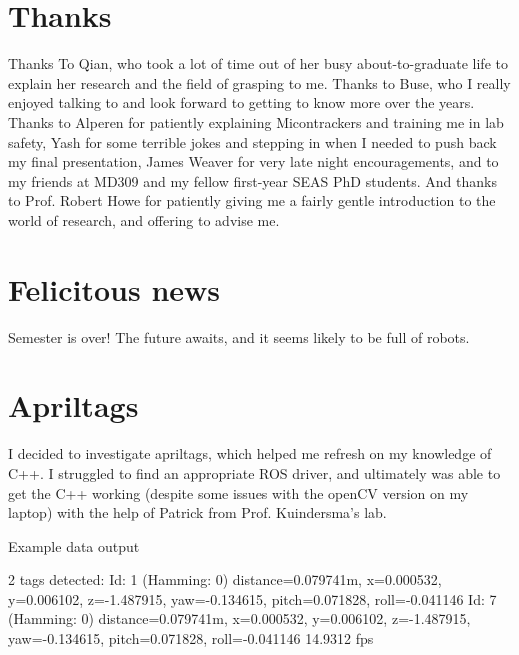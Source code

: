 \documentclass[preprint,12pt,3p]{elsarticle}
\begin{document}
\section{Thanks}

Thanks To Qian, who took a lot of time out of her busy about-to-graduate life to explain her
research and the field of grasping to me. Thanks to Buse, who I really enjoyed talking to and look
forward to getting to know more over the years. Thanks to Alperen for patiently explaining
Micontrackers and training me in lab safety, Yash for some terrible jokes and stepping in when I
needed to push back my final presentation, James Weaver for very late night encouragements, and to
my friends at MD309 and my fellow first-year SEAS PhD students.  And thanks to Prof. Robert Howe for 
patiently giving me a fairly gentle introduction to the world of research, and offering to advise
me.

\section{Felicitous news}

Semester is over! The future awaits, and it seems likely to be full of robots.

\newpage

\clearpage
\vspace*{\fill}
\begin{center}
\begin{minipage}{.6\textwidth}
\Huge
{}
\normalsize
\end{minipage}
\end{center}
\vfill %
\clearpage

\appendix

\section{Apriltags}
I decided to investigate apriltags, which helped me refresh on my knowledge of C++. I struggled to
find an appropriate ROS driver, and ultimately was able to get the C++ working (despite some issues
with the openCV version on my laptop) with the help of Patrick from Prof. Kuindersma's lab.

Example data output
\begin{ttlisting}
2 tags detected: 
Id: 1 (Hamming: 0) distance=0.079741m, x=0.000532, y=0.006102, z=-1.487915, yaw=-0.134615, pitch=0.071828, roll=-0.041146
Id: 7 (Hamming: 0) distance=0.079741m, x=0.000532, y=0.006102, z=-1.487915, yaw=-0.134615, pitch=0.071828, roll=-0.041146
14.9312 fps
\end{ttlisting}
\end{document}
